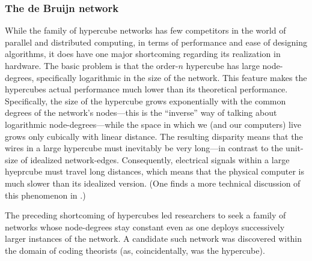\subsubsection{The de Bruijn network}
\label{sec:deBruijn-network}

While the family of hypercube networks has few competitors in the
world of parallel and distributed computing, in terms of performance
and ease of designing algorithms, it does have one major shortcoming
regarding its realization in hardware.  The basic problem is that the
order-$n$ hypercube has large node-degrees, specifically logarithmic
in the size of the network.  This feature makes the hypercubes actual
performance much lower than its theoretical performance.
Specifically, the size of the hypercube grows exponentially with the
common degrees of the network's nodes---this is the ``inverse'' way
of talking about logarithmic node-degrees---while the space in which
we (and our computers) live grows only cubically with linear
distance.  The resulting disparity means that the wires in a large
hypercube must inevitably be very long---in contrast to the unit-size
of idealized network-edges.  Consequently, electrical signals within a
large hyeprcube must travel long distances, which means that the
physical computer is much slower than its idealized version.  (One
finds a more technical discussion of this phenomenon in
\cite{Ullman84}.)

The preceding shortcoming of hypercubes led researchers to seek a
family of networks whose node-degrees stay constant even as one
deploys successively larger instances of the network.  A candidate
such network was discovered within the domain of coding theorists (as,
coincidentally, was the hypercube).  

